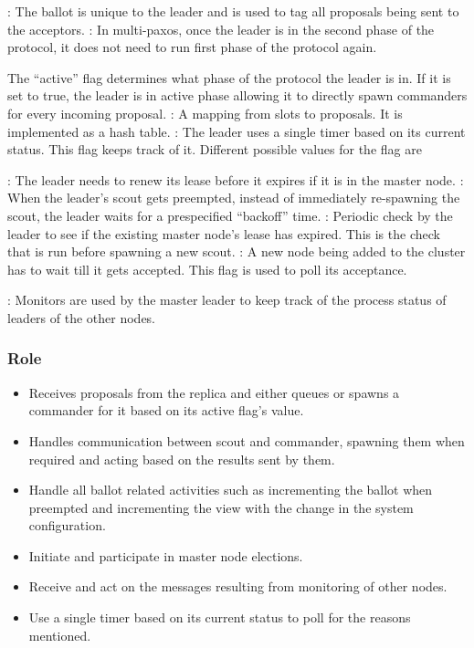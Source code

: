 \begin{itemize}
    : The ballot is unique to the leader and is used to tag all
    proposals being sent to the acceptors.
    : In multi-paxos, once the leader is in the second phase of
    the protocol, it does not need to run first phase of the protocol again.

    The ``active'' flag determines what phase of the protocol the leader is in.
    If it is set to true, the leader is in active phase allowing it to directly
    spawn commanders for every incoming proposal.
    : A mapping from slots to proposals. It is implemented as
    a hash table.
    : The leader uses a single timer based on its current
    status. This flag keeps track of it. Different possible values for the flag
    are
    \begin{itemize}
        : The leader needs to renew its lease before it expires if
        it is in the master node.
        : When the leader's scout gets preempted, instead of
        immediately re-spawning the scout, the leader waits for a prespecified
        ``backoff'' time.
        : Periodic check by the leader to see if the
        existing master node's lease has expired. This is the check that is run
        before spawning a new scout.
        : A new node being added to the cluster has to wait
        till it gets accepted. This flag is used to poll its acceptance.
    \end{itemize}
    : Monitors are used by the master leader to keep track of
    the process status of leaders of the other nodes.
\end{itemize}

\subsubsection{Role}

\begin{itemize}
  \item Receives proposals from the replica and either queues or spawns a
    commander for it based on its active flag's value.
  \item Handles communication between scout and commander, spawning them
    when required and acting based on the results sent by them.
  \item Handle all ballot related activities such as incrementing the ballot
    when preempted and incrementing the view with the change in the system
    configuration.
  \item Initiate and participate in master node elections.
  \item Receive and act on the messages resulting from monitoring of other
    nodes.
  \item Use a single timer based on its current status to poll for the
    reasons mentioned.
\end{itemize}

